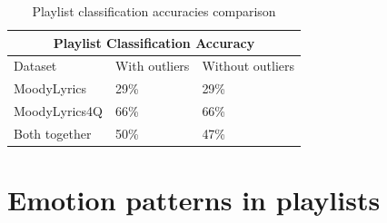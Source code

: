 \begin{table}[H]
\centering
\begin{tabular}{ |p{3cm}||p{1.5cm}|p{1.5cm}| }
 \hline
 \multicolumn{3}{|c|}{Playlist Classification Accuracy} \\
 \hline
Dataset & With outliers & Without outliers\\
 \hline
MoodyLyrics & 29\% & 29\%\\
MoodyLyrics4Q  & 66\%    &66\%\\
Both together &   50\%  & 47\%\\
\hline
\end{tabular}
\caption{Playlist classification accuracies comparison} \label{tab:comparison2}
\end{table}

\section{Emotion patterns in playlists}


